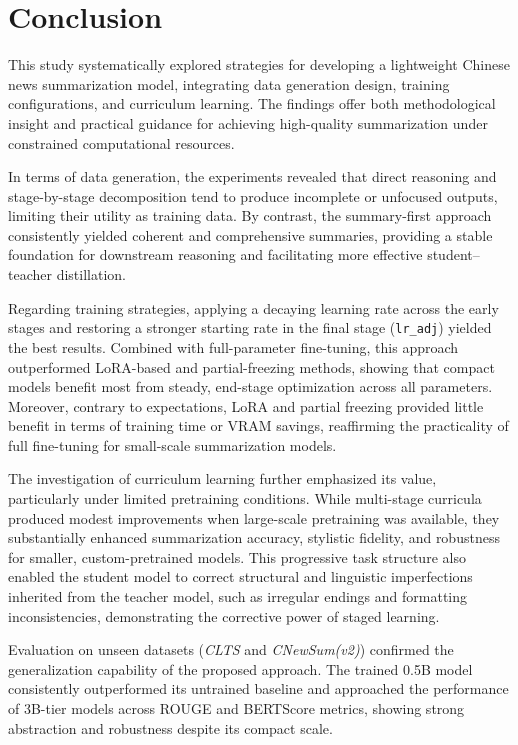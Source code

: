 \documentclass[preprint,12pt]{elsarticle}
\begin{document}
\section{Conclusion}
This study systematically explored strategies for developing a lightweight Chinese news summarization model, integrating data generation design, training configurations, and curriculum learning. The findings offer both methodological insight and practical guidance for achieving high-quality summarization under constrained computational resources.

In terms of data generation, the experiments revealed that direct reasoning and stage-by-stage decomposition tend to produce incomplete or unfocused outputs, limiting their utility as training data. By contrast, the summary-first approach consistently yielded coherent and comprehensive summaries, providing a stable foundation for downstream reasoning and facilitating more effective student–teacher distillation.

Regarding training strategies, applying a decaying learning rate across the early stages and restoring a stronger starting rate in the final stage (\texttt{lr\_adj}) yielded the best results. Combined with full-parameter fine-tuning, this approach outperformed LoRA-based and partial-freezing methods, showing that compact models benefit most from steady, end-stage optimization across all parameters. Moreover, contrary to expectations, LoRA and partial freezing provided little benefit in terms of training time or VRAM savings, reaffirming the practicality of full fine-tuning for small-scale summarization models.

The investigation of curriculum learning further emphasized its value, particularly under limited pretraining conditions. While multi-stage curricula produced modest improvements when large-scale pretraining was available, they substantially enhanced summarization accuracy, stylistic fidelity, and robustness for smaller, custom-pretrained models. This progressive task structure also enabled the student model to correct structural and linguistic imperfections inherited from the teacher model, such as irregular endings and formatting inconsistencies, demonstrating the corrective power of staged learning.

Evaluation on unseen datasets (\textit{CLTS} and \textit{CNewSum(v2)}) confirmed the generalization capability of the proposed approach. The trained 0.5B model consistently outperformed its untrained baseline and approached the performance of 3B-tier models across ROUGE and BERTScore metrics, showing strong abstraction and robustness despite its compact scale.
\end{document}
